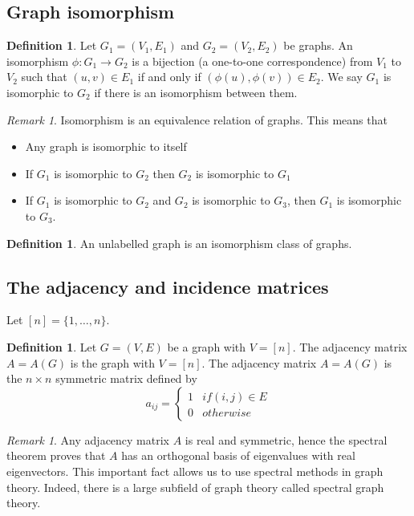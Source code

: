 \documentclass[10pt, fleqn, a4paper, landscape]{article}
\theoremstyle{plain} %
\theoremstyle{remark} %
\newtheorem{rem}[thm]{Remark}
\theoremstyle{definition} %
\newtheorem{defi}[thm]{Definition}
\begin{document}
\begin{multicols}{3}
\begin{tiny}
\subsection{Graph isomorphism}
\addtocounter{thm}{1}
\begin{defi}
 Let $G_1 = (V_1,E_1)$ and $G_2 = (V_2,E_2)$ be graphs. An isomorphism $\phi: G_1 \to G_2$ is a bijection (a one-to-one correspondence) from $V_1$ to $V_2$ such that $(u, v) \in E_1$ if and only if $(\phi(u), \phi(v))\in E_2$. We say $G_1$ is isomorphic to $G_2$ if there is an isomorphism between them.
\end{defi}
\addtocounter{thm}{1}
\begin{rem}
Isomorphism is an equivalence relation of graphs. This means that
\begin{itemize}
\item Any graph is isomorphic to itself
\item If $G_1$ is isomorphic to $G_2$ then $G_2$ is isomorphic to $G_1$
\item If $G_1 $ is isomorphic to $G_2$ and $G_2$ is isomorphic to $G_3$, then $G_1$ is isomorphic to $G_3$.
\end{itemize}
\end{rem}


\begin{defi}
An unlabelled graph is an isomorphism class of graphs.
\end{defi} 

\subsection{The adjacency and incidence matrices}

Let $[n] = \{1, \dots , n\}.$

\begin{defi}
Let $G = (V,E)$ be a graph with $V = [n].$ The adjacency matrix $A = A(G)$ is the graph with $ V = [n]$. The adjacency matrix $A = A(G)$ is the
$n \times n $ symmetric matrix defined by
\[a_{ij}=\begin{cases}1 & if (i,j)\in E\\ 0 & otherwise\end{cases}\]
\end{defi} 
\addtocounter{thm}{1}
\begin{rem}
Any adjacency matrix $A $ is real and symmetric, hence the spectral theorem proves that $A$ has an orthogonal basis of eigenvalues with real eigenvectors. This important fact allows us to use spectral methods in graph theory. Indeed, there is a large subfield of graph theory called spectral graph theory.
\end{rem}


\end{tiny}
\end{multicols}
\end{document}
